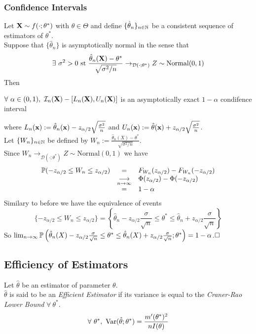 \documentclass[11pt,a4paper]{article}
\begin{document}
\subsubsection{Confidence Intervals}

Let $\textbf{X}\sim f(\cdot;\theta^*)$ with $\theta\in\Theta$ and define $\{\hat\theta_n\}_{n\in\mathbb{N}}$ be a consistent sequence of estimators of $\theta^*$.\\
Suppose that $\{\hat\theta_n\}$ is asymptotically normal in the sense that
$$\exists\ \sigma^2>0\text{ st }\frac{\hat{\theta}_n(\textbf{X})-\theta^*}{\sqrt{\sigma^2/n}}\to_{\mathcal{D}(\cdot;\theta^*)}Z\sim\text{Normal}(0,1)$$
Then
\begin{center}$\forall\ \alpha\in(0,1),\ \mathcal{I}_n(\X)-[L_n(\X),U_n(\X)]$ is an asymptotically exact $1-\alpha$ condifence interval\end{center}
where $L_n(\textbf{x}):=\hat{\theta}_n(\textbf{x})-z_{\alpha/2}\sqrt{\frac{\sigma^2}{n}}$ and $U_n(\textbf{x}):=\hat{\theta}(\textbf{x})+z_{\alpha/2}\sqrt{\frac{\sigma^2}{n}}$.\\

Let $\{W_n\}_{n\in\mathbb{N}}$ be defined by $W_n:=\frac{\hat{\theta}_n(X)-\theta^*}{\sqrt{\sigma^2/n}}$.\\
Since $W_n\to_{\mathcal{D}(\cdot;\theta^*)}Z\sim\text{Normal}(0,1)$ we have
\[\begin{array}{rcl}
\mathbb{P}(-z_{\alpha/2}\leq W_n\leq z_{\alpha/2})&=&F_{W_n}(z_{\alpha/2})-F_{W_n}(-z_{\alpha/2})\\
&\underset{n\to\infty}{\longrightarrow}&\Phi(z_{\alpha/2})-\Phi(-z_{\alpha/2})\\
&=&1-\alpha
\end{array}\]
Similary to before we have the equivalence of events
$$\{-z_{\alpha/2}\leq W_n\leq z_{\alpha/2}\}=\left\{\hat{\theta}_n-z_{\alpha/2}\frac{\sigma}{\sqrt{n}}\leq\theta^*\leq\hat{\theta}_n+z_{\alpha/2}\frac{\sigma}{\sqrt{n}}\right\}$$
So $\lim_{n\to\infty}\mathbb{P}\left(\hat{\theta}_n(X)-z_{\alpha/2}\frac{\sigma}{\sqrt{n}}\leq\theta^*\leq\hat{\theta}_n(X)+z_{\alpha/2}\frac{\sigma}{\sqrt{n}};\theta^*\right)=1-\alpha$.$\hfill\square$


\subsection{Efficiency of Estimators}

Let $\hat\theta$ be an estimator of parameter $\theta$.\\
$\hat\theta$ is said to be an \textit{Efficient Estimator} if its variance is equal to the \textit{Craner-Rao Lower Bound} $\forall\ \theta^*$.
$$\forall\ \theta^*,\ \var(\hat\theta;\theta^*)=\frac{m'(\theta^*)^2}{nI(\theta)}$$
\end{document}
